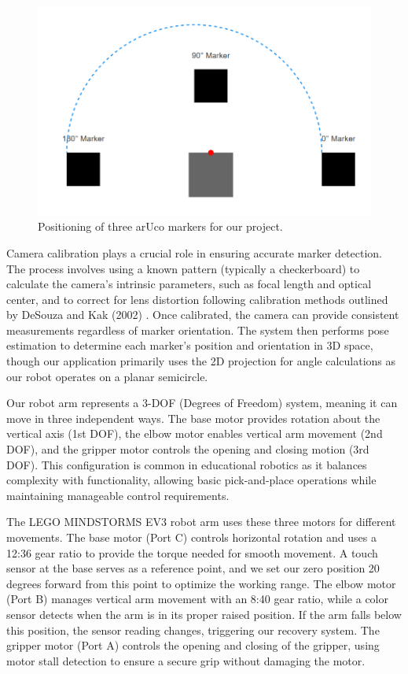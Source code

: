 \documentclass[10pt,twocolumn]{article}
\begin{document}
\begin{figure}
    \centering
    \includegraphics[width=.95\linewidth]{aruco_explaination.png}
    \caption{
        Positioning of three arUco markers for our project.
    }
    \label{fig:first-page}
\end{figure}

Camera calibration plays a crucial role in ensuring accurate marker detection. The process involves using a known pattern (typically a checkerboard) to calculate the camera's intrinsic parameters, such as focal length and optical center, and to correct for lens distortion following calibration methods outlined by DeSouza and Kak (2002) \cite{desouza2002vision}. Once calibrated, the camera can provide consistent measurements regardless of marker orientation. The system then performs pose estimation to determine each marker's position and orientation in 3D space, though our application primarily uses the 2D projection for angle calculations as our robot operates on a planar semicircle.

Our robot arm represents a 3-DOF (Degrees of Freedom) system, meaning it can move in three independent ways. The base motor provides rotation about the vertical axis (1st DOF), the elbow motor enables vertical arm movement (2nd DOF), and the gripper motor controls the opening and closing motion (3rd DOF). This configuration is common in educational robotics as it balances complexity with functionality, allowing basic pick-and-place operations while maintaining manageable control requirements.

The LEGO MINDSTORMS EV3 robot arm uses these three motors for different movements. The base motor (Port C) controls horizontal rotation and uses a 12:36 gear ratio to provide the torque needed for smooth movement. A touch sensor at the base serves as a reference point, and we set our zero position 20 degrees forward from this point to optimize the working range. The elbow motor (Port B) manages vertical arm movement with an 8:40 gear ratio, while a color sensor detects when the arm is in its proper raised position. If the arm falls below this position, the sensor reading changes, triggering our recovery system. The gripper motor (Port A) controls the opening and closing of the gripper, using motor stall detection to ensure a secure grip without damaging the motor.
\end{document}
